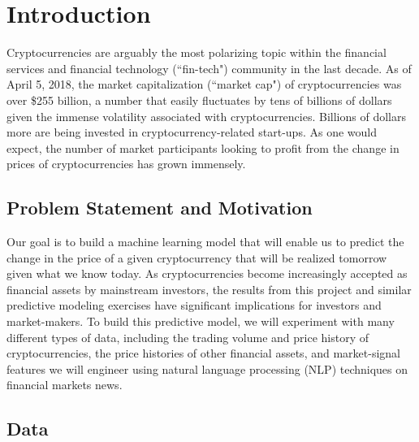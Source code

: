 \documentclass[12pt,twoside]{article}
\begin{document}
\newpage
\tableofcontents
\newpage
\setlength{\parindent}{0cm}

\section{Introduction}

Cryptocurrencies are arguably the most polarizing topic within the financial services and financial technology (``fin-tech") community in the last decade. As of April 5, 2018, the market capitalization (``market cap") of cryptocurrencies was over \$255 billion, a number that easily fluctuates by tens of billions of dollars given the immense volatility associated with cryptocurrencies. Billions of dollars more are being invested in cryptocurrency-related start-ups. As one would expect, the number of market participants looking to profit from the change in prices of cryptocurrencies has grown immensely.

\subsection{Problem Statement and Motivation}

Our goal is to build a machine learning model that will enable us to predict the change in the price of a given cryptocurrency that will be realized tomorrow given what we know today. As cryptocurrencies become increasingly accepted as financial assets by mainstream investors, the results from this project and similar predictive modeling exercises have significant implications for investors and market-makers. To build this predictive model, we will experiment with many different types of data, including the trading volume and price history of cryptocurrencies, the price histories of other financial assets, and market-signal features we will engineer using natural language processing (NLP) techniques on financial markets news.

\subsection{Data}
\end{document}
